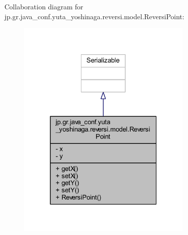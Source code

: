 Collaboration diagram for jp.\+gr.\+java\+\_\+conf.\+yuta\+\_\+yoshinaga.\+reversi.\+model.\+Reversi\+Point\+:\nopagebreak
\begin{figure}[H]
\begin{center}
\leavevmode
\includegraphics[width=241pt]{classjp_1_1gr_1_1java__conf_1_1yuta__yoshinaga_1_1reversi_1_1model_1_1_reversi_point__coll__graph}
\end{center}
\end{figure}
